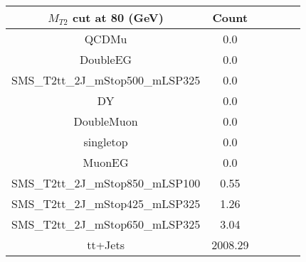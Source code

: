 \documentclass[8pt]{article}
\begin{document}
\begin{tabular}{|c|c|c|c|c|c|}
\hline
$M_{T2}$ cut at 80 (GeV) & Count \\
\hline
\hline
QCDMu & 0.0\\
DoubleEG & 0.0\\
SMS\_T2tt\_2J\_mStop500\_mLSP325 & 0.0\\
DY & 0.0\\
DoubleMuon & 0.0\\
singletop & 0.0\\
MuonEG & 0.0\\
SMS\_T2tt\_2J\_mStop850\_mLSP100 & 0.55\\
SMS\_T2tt\_2J\_mStop425\_mLSP325 & 1.26\\
SMS\_T2tt\_2J\_mStop650\_mLSP325 & 3.04\\
tt+Jets & 2008.29\\
\hline
\hline
\end{tabular}
\end{document}
